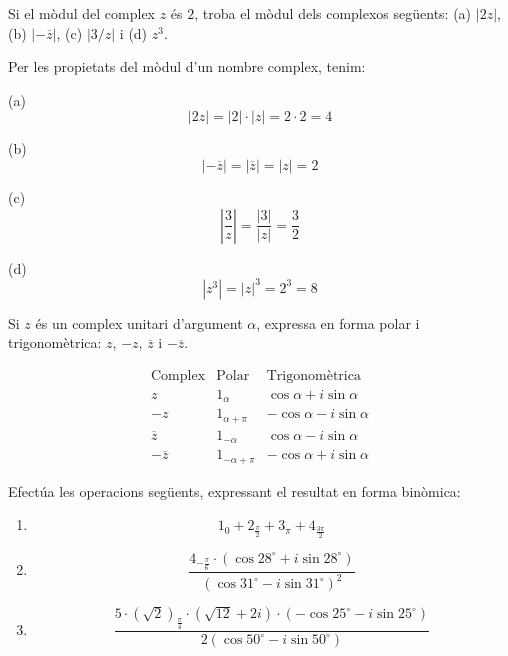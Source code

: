 \begin{exercici}
Si el mòdul del complex $z$ és $2$, troba el mòdul dels
complexos següents: (a) $\left\vert 2z\right\vert $, (b) $\left\vert -
\overline{z}\right\vert $, (c) $\left\vert 3/z\right\vert $ i (d) $z^{3}$.
\end{exercici}

\begin{solucio}
Per les propietats del mòdul d’un nombre complex, tenim:

(a)
\[
\left\vert 2z\right\vert =\left\vert 2\right\vert \cdot \left\vert
z\right\vert =2\cdot 2=4
\]

(b)
\[
\left\vert -\overline{z}\right\vert =\left\vert \overline{z}\right\vert
=\left\vert z\right\vert =2
\]

(c)
\[
\left\vert \frac{3}{z}\right\vert =\frac{\left\vert 3\right\vert }{
\left\vert z\right\vert }=\frac{3}{2}
\]

(d)
\[
\left\vert z^{3}\right\vert =\left\vert z\right\vert ^{3}=2^{3}=8
\]
\end{solucio}

\begin{exercici}
Si $z$ és un complex unitari d’argument $\alpha $, expressa en forma
polar i trigonomètrica: $z$, $-z$, $\overline{z}$ i $-\overline{z}$.
\end{exercici}

\begin{solucio}
\[
\begin{array}{lll}
\text{Complex} & \text{Polar} & \text{Trigonomètrica} \\
z & 1_{\alpha } & \cos \alpha +i\sin \alpha \\
-z & 1_{\alpha +\pi } & -\cos \alpha -i\sin \alpha \\
\overline{z} & 1_{-\alpha } & \cos \alpha -i\sin \alpha \\
-\overline{z} & 1_{-\alpha +\pi } & -\cos \alpha +i\sin \alpha
\end{array}
\]
\end{solucio}

\begin{exercici}
Efectúa les operacions següents, expressant el resultat en forma binòmica:

\begin{enumerate}
\item[a)]
\[
1_{0}+2_{\frac{\pi }{2}}+3_{\pi }+4_{\frac{3\pi }{2}}
\]

\item[b)]
\[
\frac{4_{-\frac{\pi }{6}}\cdot (\cos 28
^{\circ}
+i\sin 28
^{\circ}
)}{(\cos 31
^{\circ}
-i\sin 31
^{\circ}
)^{2}}
\]

\item[c)]
\[
\frac{5\cdot \left( \sqrt{2}\right) _{\frac{\pi }{4}}\cdot \left( \sqrt{12}
+2i\right) \cdot (-\cos 25
^{\circ}
-i\sin 25
^{\circ}
)}{2(\cos 50
^{\circ}
-i\sin 50
^{\circ}
)}
\]
\end{enumerate}
\end{exercici}

